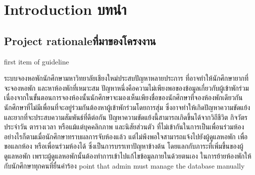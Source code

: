 \chapter{\ifenglish Introduction \else บทนำ\fi}
\section{\ifenglish Project rationale\else ที่มาของโครงงาน\fi}

{first item of guideline}

ระบบจองหอพักนักศึกษามหาวิทยาลัยเชียงใหม่ประสบปัญหาหลายประการ ที่อาจทำให้นักศึกษายากที่จะจองหอพัก 
และหาห้องพักที่เหมาะสม ปัญหาหนึ่งคือความไม่เพียงพอของข้อมูลเกี่ยวกับผู้เข้าพักร่วม 
เนื่องจากในขั้นตอนการจองห้องนั้นนักศึกษาจะมองเห็นเพียงชื่อของนักศึกษาที่จองห้องพักเดียวกัน
นักศึกษาที่ไม่มีเพื่อนที่จะอยู่ร่วมกันต้องหาผู้เข้าพักร่วมโดยการสุ่ม ซึ่งอาจทำให้เกิดปัญหาความขัดแย้ง 
และยากที่จะประสบความสัมพันธ์ที่ดีต่อกัน ปัญหาความขัดแย้งนี้สามารถเกิดขึ้นได้จากวิถีชีวิต กิจวัตรประจำวัน 
ตารางเวลา หรือแม้แต่บุคคลิกภาพ และนิสัยส่วนตัว ที่ไม่เข้ากันในการเป็นเพื่อนร่วมห้อง
อย่างไรก็ตามเมื่อนักศึกษาทราบผลการจับห้องแล้ว แต่ไม่พึงพอใจสามารถแจ้งไปยังผู้ดูแลหอพัก 
เพื่อขอแลกห้อง หรือเพื่อนร่วมห้องได้ ซึ่งเป็นการบรรเทาปัญหาข้างต้น โดยแลกกับภาระที่เพิ่มขึ้นของผู้ดูแลหอพัก
\ME
{เพราะผู้ดูแลหอพักนั้นต้องทำการเข้าไปแก้ไขข้อมูลภายในด้วยตนเอง ในการย้ายห้องพักให้กับนักศึกษาทุกคนที่ยื่นคำร้อง}
{point that admin must manage the database manually}

